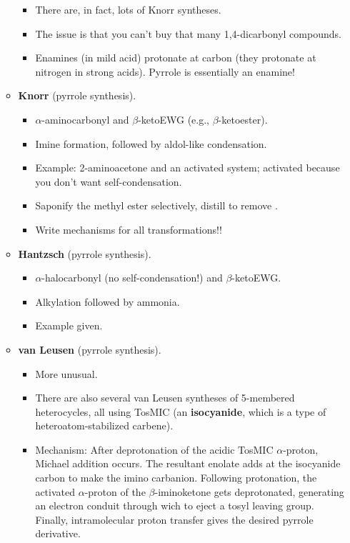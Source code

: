 \documentclass[../notes.tex]{subfiles}
\begin{document}
\begin{itemize}
\begin{itemize}
\begin{itemize}
            \item There are, in fact, lots of Knorr syntheses.
            \item The issue is that you can't buy that many 1,4-dicarbonyl compounds.
            \item Enamines (in mild acid) protonate at carbon (they protonate at nitrogen in strong acids). Pyrrole is essentially an enamine!
        \end{itemize}
        \item \textbf{Knorr} (pyrrole synthesis).
        \begin{itemize}
            \item $\alpha$-aminocarbonyl and $\beta$-ketoEWG (e.g., $\beta$-ketoester).
            \item Imine formation, followed by aldol-like condensation.
            \item Example: 2-aminoacetone and an activated system; activated because you don't want self-condensation.
            \item Saponify the methyl ester selectively, distill to remove .
            \item Write mechanisms for all transformations!!
        \end{itemize}
        \item \textbf{Hantzsch} (pyrrole synthesis).
        \begin{itemize}
            \item $\alpha$-halocarbonyl (no self-condensation!) and $\beta$-ketoEWG.
            \item Alkylation followed by ammonia.
            \item Example given.
        \end{itemize}
        \item \textbf{van Leusen} (pyrrole synthesis).
        \begin{itemize}
            \item More unusual.
            \item There are also several van Leusen syntheses of 5-membered heterocycles, all using TosMIC (an \textbf{isocyanide}, which is a type of heteroatom-stabilized carbene).
            \item Mechanism: After deprotonation of the acidic TosMIC $\alpha$-proton, Michael addition occurs. The resultant enolate adds at the isocyanide carbon to make the imino carbanion. Following protonation, the activated $\alpha$-proton of the $\beta$-iminoketone gets deprotonated, generating an electron conduit through wich to eject a tosyl leaving group. Finally, intramolecular proton transfer gives the desired pyrrole derivative.

\end{itemize}
\end{itemize}
\end{itemize}
\end{document}
